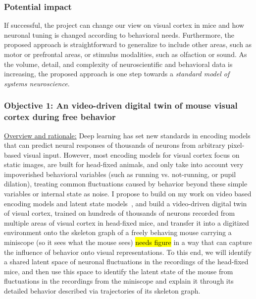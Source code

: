 \documentclass[COG,11pt]{ercgrant}
\begin{document}
\subsubsection{Potential impact}
If successful, the project can change our view on visual cortex in mice and how neuronal tuning is changed according to behavioral needs. 
Furthermore, the proposed approach is straightforward to generalize to include other areas, such as motor or prefrontal areas, or stimulus modalities, such as olfaction or sound. 
As the volume, detail, and complexity of neuroscientific and behavioral data is increasing, the proposed approach is one step towards a \textit{standard model of systems neuroscience}.


\subsubsection{Objective 1: An video-driven digital twin of mouse visual cortex during free behavior\hfill{}}

\underline{Overview and rationale:}
Deep learning has set new standards in encoding models that can predict neural responses of thousands of neurons from arbitrary pixel-based visual input. However, most encoding models for visual cortex focus on static images, are built for head-fixed animals, and only take into account very impoverished behavioral variables (such as running vs. not-running, or pupil dilation), 
treating common fluctuations caused by behavior beyond these simple variables or internal state as noise. 
I propose to build on my work on video based encoding models and latent state models~\parencite{Sinz2018-sk, Bashiri2021-or}, and build a video-driven  digital twin of visual cortex, trained on hundreds of thousands of neurons recorded from multiple areas of visual cortex in head-fixed mice, and transfer it into a digitized environment onto the skeleton graph of a freely behaving mouse carrying a miniscope (so it sees what the mouse sees) \hl{needs figure} in a way that can capture the influence of behavior onto visual representations. 
To this end, we will identify a shared latent space of neuronal fluctuations in the recordings of the head-fixed mice, and then use this space to identify the latent state of the mouse from fluctuations in the recordings from the miniscope and explain it through its detailed behavior described via trajectories of its skeleton graph.
\end{document}
